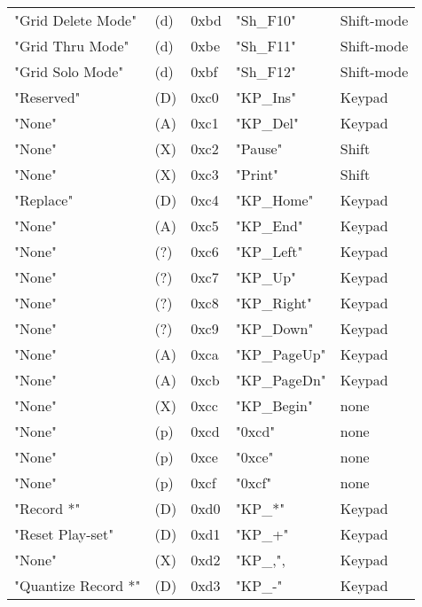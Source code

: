 \begin{table}[htb]
\begin{tabular}{l l l l l}
        "Grid Delete Mode"   & (d)  &  0xbd   & "Sh\_F10"    &  Shift-mode \\
        "Grid Thru Mode"     & (d)  &  0xbe   & "Sh\_F11"    &  Shift-mode \\
        "Grid Solo Mode"     & (d)  &  0xbf   & "Sh\_F12"    &  Shift-mode \\
        "Reserved"           & (D)  &  0xc0   & "KP\_Ins"    &  Keypad \\
        "None"               & (A)  &  0xc1   & "KP\_Del"    &  Keypad \\
        "None"               & (X)  &  0xc2   & "Pause"      & Shift \\
        "None"               & (X)  &  0xc3   & "Print"      & Shift \\
        "Replace"            & (D)  &  0xc4   & "KP\_Home"   &  Keypad \\
        "None"               & (A)  &  0xc5   & "KP\_End"    &  Keypad \\
        "None"               & (?)  &  0xc6   & "KP\_Left"   &  Keypad \\
        "None"               & (?)  &  0xc7   & "KP\_Up"     &  Keypad \\
        "None"               & (?)  &  0xc8   & "KP\_Right"  &  Keypad \\
        "None"               & (?)  &  0xc9   & "KP\_Down"   &  Keypad \\
        "None"               & (A)  &  0xca   & "KP\_PageUp" &  Keypad \\
        "None"               & (A)  &  0xcb   & "KP\_PageDn" &  Keypad \\
        "None"               & (X)  &  0xcc   & "KP\_Begin"  &  none \\
        "None"               & (p)  &  0xcd   & "0xcd"       & none \\
        "None"               & (p)  &  0xce   & "0xce"       & none \\
        "None"               & (p)  &  0xcf   & "0xcf"       & none \\
        "Record *"           & (D)  &  0xd0   & "KP\_*"      &  Keypad \\
        "Reset Play-set"     & (D)  &  0xd1   & "KP\_+"      &  Keypad \\
        "None"               & (X)  &  0xd2   & "KP\_,",     &  Keypad \\
        "Quantize Record *"  & (D)  &  0xd3   & "KP\_-"      &  Keypad \\

\end{tabular}
\end{table}
